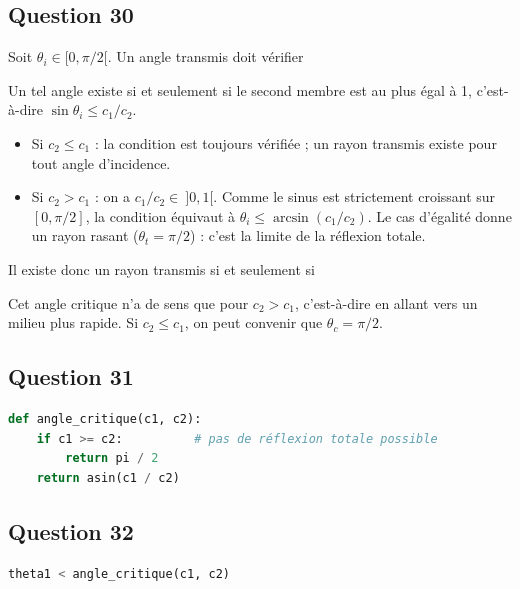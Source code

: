 \documentclass[11pt,a4paper]{article}
\providecommand{\tightlist}{\setlength{\itemsep}{0pt}\setlength{\parskip}{0pt}}
\newcommand{\equationajustee}[1]{%
  \sbox{\boiteequation}{$\displaystyle #1$}%
  \ifdim\wd\boiteequation>\linewidth
    \[\resizebox{\linewidth}{!}{\usebox{\boiteequation}}\]%
  \else
    \[#1\]%
  \fi}
\begin{document}
\hypertarget{question-30}{%
\subsection{Question 30}\label{question-30}}

Soit \(\theta_i \in [0, \pi/2[\). Un angle transmis doit vérifier

\equationajustee{\sin\theta_t = \frac{c_2}{c_1}\sin\theta_i .}

Un tel angle existe si et seulement si le second membre est au plus égal à 1, c'est-à-dire \(\sin\theta_i \le c_1/c_2\).

\begin{itemize}
\tightlist
\item
  Si \(c_2 \le c_1\) : la condition est toujours vérifiée ; un rayon transmis existe pour tout angle d'incidence.
\item
  Si \(c_2 > c_1\) : on a \(c_1/c_2 \in\ ]0, 1[\). Comme le sinus est strictement croissant sur \([0, \pi/2]\), la condition équivaut à \(\theta_i \le \arcsin(c_1/c_2)\). Le cas d'égalité donne un rayon rasant (\(\theta_t = \pi/2\)) : c'est la limite de la réflexion totale.
\end{itemize}

Il existe donc un rayon transmis si et seulement si

\equationajustee{\boxed{\theta_i < \theta_c = \arcsin\left(\frac{c_1}{c_2}\right)}}

Cet angle critique n'a de sens que pour \(c_2 > c_1\), c'est-à-dire en allant vers un milieu plus rapide. Si \(c_2 \le c_1\), on peut convenir que \(\theta_c = \pi/2\).

\hypertarget{question-31}{%
\subsection{Question 31}\label{question-31}}

\begin{lstlisting}[language=Python]
def angle_critique(c1, c2):
    if c1 >= c2:          # pas de réflexion totale possible
        return pi / 2
    return asin(c1 / c2)
\end{lstlisting}

\hypertarget{question-32}{%
\subsection{Question 32}\label{question-32}}

\begin{lstlisting}[language=Python]
theta1 < angle_critique(c1, c2)
\end{lstlisting}
\end{document}
